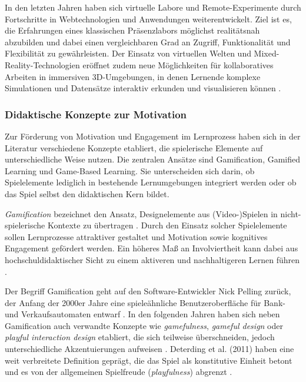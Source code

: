In den letzten Jahren haben sich virtuelle Labore und Remote-Experimente durch Fortschritte in Webtechnologien und Anwendungen weiterentwickelt. Ziel ist es, die Erfahrungen eines klassischen Präsenzlabors möglichst realitätsnah abzubilden und dabei einen vergleichbaren Grad an Zugriff, Funktionalität und Flexibilität zu gewährleisten. Der Einsatz von virtuellen Welten und Mixed-Reality-Technologien eröffnet zudem neue Möglichkeiten für kollaboratives Arbeiten in immersiven 3D-Umgebungen, in denen Lernende komplexe Simulationen und Datensätze interaktiv erkunden und visualisieren können \parencite[S.~1]{savin-baden_understanding_2012}.

\subsubsection{Didaktische Konzepte zur Motivation}

Zur Förderung von Motivation und Engagement im Lernprozess haben sich in der Literatur verschiedene Konzepte etabliert, die spielerische Elemente auf unterschiedliche Weise nutzen. Die zentralen Ansätze sind Gamification, Gamified Learning und Game-Based Learning. Sie unterscheiden sich darin, ob Spielelemente lediglich in bestehende Lernumgebungen integriert werden oder ob das Spiel selbst den didaktischen Kern bildet.

\textit{Gamification} bezeichnet den Ansatz, Designelemente aus (Video-)Spielen in nicht-spielerische Kontexte zu übertragen \parencites[S.~2]{deterding_gamification_2011}[S.~9]{kapp_gamification_2012}. Durch den Einsatz solcher Spielelemente sollen Lernprozesse attraktiver gestaltet und Motivation sowie kognitives Engagement gefördert werden. Ein höheres Maß an Involviertheit kann dabei aus hochschuldidaktischer Sicht zu einem aktiveren und nachhaltigeren Lernen führen \parencites[S.~97ff]{chi_active-constructive-interactive_2009}[S.~1821]{chi_translating_2018}.

Der Begriff Gamification geht auf den Software-Entwickler Nick Pelling zurück, der Anfang der 2000er Jahre eine spieleähnliche Benutzeroberfläche für Bank- und Verkaufsautomaten entwarf \parencites{pelling_short_2011}[S.~2f]{deterding_gamification_2011}. In den folgenden Jahren haben sich neben Gamification auch verwandte Konzepte wie \textit{gamefulness}, \textit{gameful design} oder \textit{playful interaction design} etabliert, die sich teilweise überschneiden, jedoch unterschiedliche Akzentuierungen aufweisen \parencite[S.~2f]{deterding_gamification_2011}. Deterding et al. (2011) haben eine weit verbreitete Definition geprägt, die das Spiel als konstitutive Einheit betont und es von der allgemeinen Spielfreude (\textit{playfulness}) abgrenzt \parencites[S.~2f]{deterding_gamification_2011}[S.~452f]{schlag_gamifizierung_2021}.

